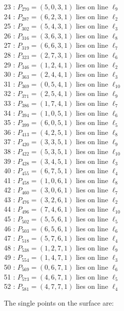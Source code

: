 \documentclass{article}
\begin{document}
{\begin{multicols}{2}
23 : $P_{270}=( 5, 0, 3, 1 )$ lies on line $\ell_{9}$\\
24 : $P_{287}=( 6, 2, 3, 1 )$ lies on line $\ell_{2}$\\
25 : $P_{302}=( 5, 4, 3, 1 )$ lies on line $\ell_{3}$\\
26 : $P_{316}=( 3, 6, 3, 1 )$ lies on line $\ell_{8}$\\
27 : $P_{319}=( 6, 6, 3, 1 )$ lies on line $\ell_{7}$\\
28 : $P_{323}=( 2, 7, 3, 1 )$ lies on line $\ell_{6}$\\
29 : $P_{346}=( 1, 2, 4, 1 )$ lies on line $\ell_{2}$\\
30 : $P_{363}=( 2, 4, 4, 1 )$ lies on line $\ell_{3}$\\
31 : $P_{369}=( 0, 5, 4, 1 )$ lies on line $\ell_{10}$\\
32 : $P_{371}=( 2, 5, 4, 1 )$ lies on line $\ell_{9}$\\
33 : $P_{386}=( 1, 7, 4, 1 )$ lies on line $\ell_{7}$\\
34 : $P_{394}=( 1, 0, 5, 1 )$ lies on line $\ell_{6}$\\
35 : $P_{399}=( 6, 0, 5, 1 )$ lies on line $\ell_{5}$\\
36 : $P_{413}=( 4, 2, 5, 1 )$ lies on line $\ell_{8}$\\
37 : $P_{420}=( 3, 3, 5, 1 )$ lies on line $\ell_{9}$\\
38 : $P_{422}=( 5, 3, 5, 1 )$ lies on line $\ell_{10}$\\
39 : $P_{428}=( 3, 4, 5, 1 )$ lies on line $\ell_{3}$\\
40 : $P_{455}=( 6, 7, 5, 1 )$ lies on line $\ell_{4}$\\
41 : $P_{458}=( 1, 0, 6, 1 )$ lies on line $\ell_{8}$\\
42 : $P_{460}=( 3, 0, 6, 1 )$ lies on line $\ell_{7}$\\
43 : $P_{476}=( 3, 2, 6, 1 )$ lies on line $\ell_{2}$\\
44 : $P_{496}=( 7, 4, 6, 1 )$ lies on line $\ell_{10}$\\
45 : $P_{502}=( 5, 5, 6, 1 )$ lies on line $\ell_{5}$\\
46 : $P_{503}=( 6, 5, 6, 1 )$ lies on line $\ell_{6}$\\
47 : $P_{518}=( 5, 7, 6, 1 )$ lies on line $\ell_{4}$\\
48 : $P_{538}=( 1, 2, 7, 1 )$ lies on line $\ell_{9}$\\
49 : $P_{554}=( 1, 4, 7, 1 )$ lies on line $\ell_{3}$\\
50 : $P_{569}=( 0, 6, 7, 1 )$ lies on line $\ell_{6}$\\
51 : $P_{573}=( 4, 6, 7, 1 )$ lies on line $\ell_{5}$\\
52 : $P_{581}=( 4, 7, 7, 1 )$ lies on line $\ell_{4}$\\
\end{multicols}
The single points on the surface are:\\
}
\end{document}
